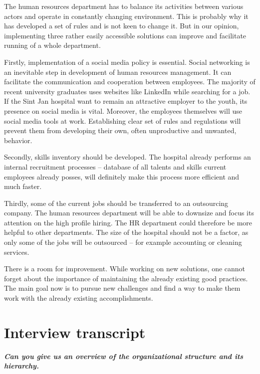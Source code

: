 \documentclass[a4paper,fleqn,11pt,dvips,titlepage]{article}
\newcommand{\question}[1]{\textbf{\textit{#1}}}
\numberwithin{figure}{section}
\numberwithin{equation}{section}
\begin{document}
The human resources department has to balance its activities between various actors and operate in constantly changing environment. This is probably why it has developed a set of rules and is not keen to change it. But in our opinion, implementing three rather easily accessible solutions can improve and facilitate running of a whole department. 

Firstly, implementation of a social media policy is essential. Social networking is an inevitable step in development of human resources management. It can facilitate the communication and cooperation between employees. The majority of recent university graduates uses websites like LinkedIn while searching for a job. If the Sint Jan hospital want to remain an attractive employer to the youth, its presence on social media is vital. Moreover, the employees themselves will use social media tools at work. Establishing clear set of rules and regulations will prevent them from developing their own, often unproductive and unwanted, behavior. 

Secondly, skills inventory should be developed. The hospital already performs an internal recruitment processes – database of all talents and skills current employees already posses, will definitely make this process more efficient and much faster. 

Thirdly, some of the current jobs should be transferred to an outsourcing company. The human resources department will be able to downsize and focus its attention on the high profile hiring. The HR department could therefore be more helpful to other departments. The size of the hospital should not be a factor, as only some of the jobs will be outsourced – for example accounting or cleaning services. 

There is a room for improvement. While working on new solutions, one cannot forget about the importance of maintaining the already existing good practices. The main goal now is to pursue new challenges and find a way to make them work with the already existing accomplishments. 

\newpage
{}



\newpage
\appendix

\section{Interview transcript}


\question{Can you give us an overview of the organizational structure and its hierarchy. }
\end{document}
